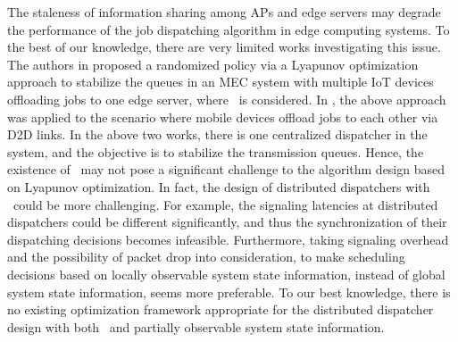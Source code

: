 The staleness of information sharing among APs and edge servers may degrade the performance of the job dispatching algorithm in edge computing systems.
To the best of our knowledge, there are very limited works investigating this issue.
The authors in \cite{JSAC17-LyuX} proposed a randomized policy via a Lyapunov optimization approach to stabilize the queues in an MEC system with multiple IoT devices offloading jobs to one edge server, where \brlatency~is considered. 
In \cite{TWC18-LyuX}, the above approach was applied to the scenario where mobile devices offload jobs to each other via D2D links.
In the above two works, there is one centralized dispatcher in the system, and the objective is to stabilize the transmission queues.
Hence, the existence of \brlatency~may not pose a significant challenge to the algorithm design based on Lyapunov optimization.
In fact, the design of distributed dispatchers with \brlatency~could be more challenging.
For example, the signaling latencies at distributed dispatchers could be different significantly, and thus the synchronization of their dispatching decisions becomes infeasible.
Furthermore, taking signaling overhead and the possibility of packet drop into consideration, to make scheduling decisions based on locally observable system state information, instead of global system state information, seems more preferable.
To our best knowledge, there is no existing optimization framework appropriate for the distributed dispatcher design with both \brlatency~and partially observable system state information.

